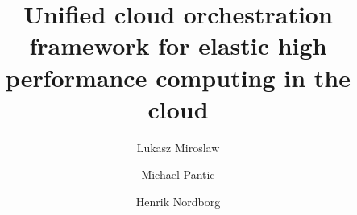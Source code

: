 \documentclass[3p,times]{elsarticle}
\begin{document}
\begin{frontmatter}




\title{Unified cloud orchestration framework for elastic high performance computing in the cloud}


\author[hsr,pwr]{Lukasz Miroslaw}
\author[eth]{Michael Pantic}
\author[hsr]{Henrik Nordborg}

\address[hsr]{Institute for Energy Technology, Hochschule Rapperswil, Switzerland}
\address[eth]{ETH Zurich, Switzerland}
\address[pwr]{Wroclaw University of Technology, Poland}

\begin{abstract}


\end{abstract}
\end{frontmatter}
\end{document}
